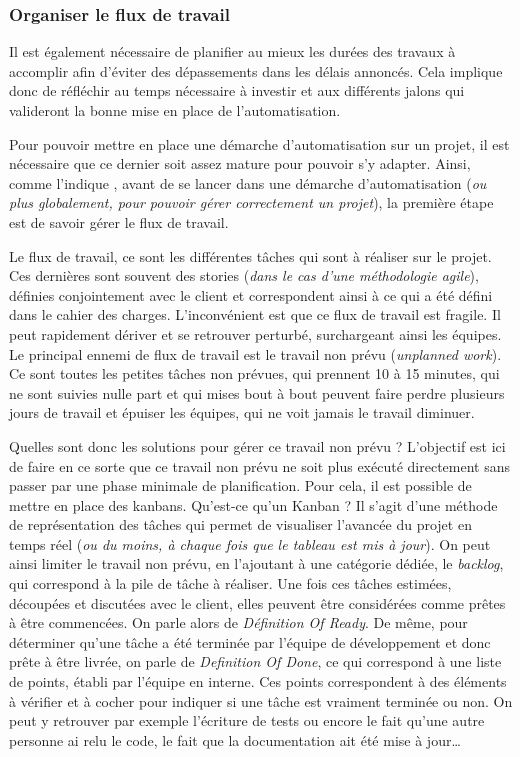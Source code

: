 \subsubsection{Organiser le flux de travail}
Il est également nécessaire de planifier au mieux les durées des travaux à accomplir afin d'éviter des dépassements dans les délais annoncés. Cela implique donc de réfléchir au temps nécessaire à investir et aux différents jalons qui valideront la bonne mise en place de l'automatisation. 

Pour pouvoir mettre en place une démarche d'automatisation sur un projet, il est nécessaire que ce dernier soit assez mature pour pouvoir s'y adapter. Ainsi, comme l'indique  \cite{phoenixProject}, avant de se lancer dans une démarche d'automatisation (\emph{ou plus globalement, pour pouvoir gérer correctement un projet}), la première étape est de savoir gérer le flux de travail.

Le flux de travail, ce sont les différentes tâches qui sont à réaliser sur le projet. Ces dernières sont souvent des stories (\emph{dans le cas d'une méthodologie agile}), définies conjointement avec le client et correspondent ainsi à ce qui a été défini dans le cahier des charges. L'inconvénient est que ce flux de travail est fragile. Il peut rapidement dériver et se retrouver perturbé, surchargeant ainsi les équipes. Le principal ennemi de flux de travail est le travail non prévu (\emph{unplanned work}). Ce sont toutes les petites tâches non prévues, qui prennent 10 à 15 minutes, qui ne sont suivies nulle part et qui mises bout à bout peuvent faire perdre plusieurs jours de travail et épuiser les équipes, qui ne voit jamais le travail diminuer.

Quelles sont donc les solutions pour gérer ce travail non prévu ? L'objectif est ici de faire en ce sorte que ce travail non prévu ne soit plus exécuté directement sans passer par une phase minimale de planification. Pour cela, il est possible de mettre en place des kanbans. Qu'est-ce qu'un Kanban ? Il s'agit d'une méthode de représentation des tâches qui permet de visualiser l'avancée du projet en temps réel (\emph{ou du moins, à chaque fois que le tableau est mis à jour}). On peut ainsi limiter le travail non prévu, en l'ajoutant à une catégorie dédiée, le \emph{backlog}, qui correspond à la pile de tâche à réaliser. Une fois ces tâches estimées, découpées et discutées avec le client, elles peuvent être considérées comme prêtes à être commencées. On parle alors de \emph{Définition Of Ready}. De même, pour déterminer qu'une tâche a été terminée par l'équipe de développement et donc prête à être livrée, on parle de \emph{Definition Of Done}, ce qui correspond à une liste de points, établi par l'équipe en interne. Ces points correspondent à des éléments à vérifier et à cocher pour indiquer si une tâche est vraiment terminée ou non. On peut y retrouver par exemple l'écriture de tests ou encore le fait qu'une autre personne ai relu le code, le fait que la documentation ait été mise à jour\ldots

